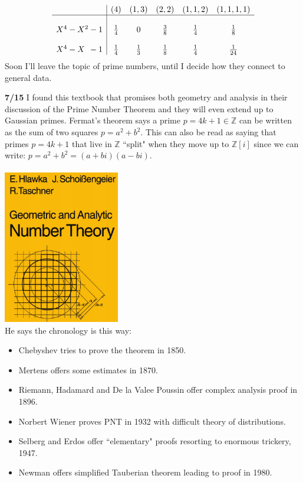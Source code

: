 \documentclass[12pt]{article}
\begin{document}
$$ \begin{array}{l|ccccc}
 & (4) & (1, 3) & (2,2) & (1,1,2) & (1,1,1,1 ) \\ \hline \\
X^4 - X^2 - 1 & \frac{1}{4} & 0 & \frac{3}{8} & \frac{1}{4} & \frac{1}{8} \\\\
X^4 - X \,\;- 1 & \frac{1}{4} &\frac{1}{3} & \frac{1}{8} & \frac{1}{4} & \frac{1}{24}
\end{array} $$
Soon I'll leave the topic of prime numbers, until I decide how they connect to general data.

\newpage

\noindent \textbf{7/15} I found this textbook that promises both geometry and analysis in their discussion of the Prime Number Theorem and they will even extend up to Gaussian primes.  Fermat's theorem says a prime $p = 4k+1 \in \mathbb{Z}$ can be written as the sum of two squares $p = a^2 + b^2$.  This can also be read as saying that primes $p = 4k+1$ that live in $\mathbb{Z}$ ``split" when they move up to $\mathbb{Z}[i]$ since we can write: $p = a^2 + b^2 = (a+bi)(a-bi)$. \\ \\ \includegraphics[width=2in]{pnt-resurgence-01.png}  \\
He says the chronology is this way:
\begin{itemize}
\item Chebyshev tries to prove the theorem in {\color{orange!50!green}1850}.
\item Mertens offers some estimates in {\color{orange!50!green} 1870}.
\item Riemann, Hadamard and De la Valee Poussin offer complex analysis proof in {\color{orange!50!green}1896}.
\item Norbert Wiener proves PNT in {\color{orange!50!green}1932} with difficult theory of distributions.
\item Selberg and Erdos offer ``elementary" proofs resorting to enormous trickery,  {\color{orange!50!green} 1947}.
\item Newman offers simplified Tauberian theorem leading to proof in {\color{orange!50!green} 1980}.
\end{itemize}
\end{document}
